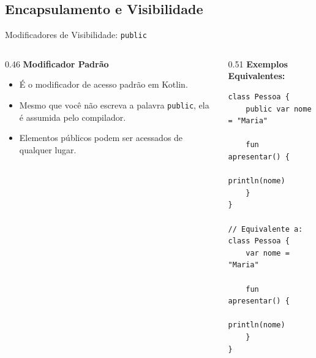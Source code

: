 \documentclass[aspectratio=169]{beamer}
\begin{document}
\subsection{Encapsulamento e Visibilidade}

\begin{frame}[fragile]{Modificadores de Visibilidade: \texttt{public}}
  \begin{columns}[T]
    \begin{column}{0.46\textwidth}
      \textbf{Modificador Padrão}
      \vspace{0.3em}
      \begin{itemize}\small
        \item É o modificador de acesso padrão em Kotlin.
        \item Mesmo que você não escreva a palavra \texttt{public}, ela é assumida pelo compilador.
        \item Elementos públicos podem ser acessados de qualquer lugar.
      \end{itemize}
    \end{column}
    \begin{column}{0.51\textwidth}
      \textbf{Exemplos Equivalentes:}
\begin{lstlisting}[style=KotlinStyle]
class Pessoa {
    public var nome = "Maria"

    fun apresentar() {
        println(nome)
    }
}

// Equivalente a:
class Pessoa {
    var nome = "Maria"

    fun apresentar() {
        println(nome)
    }
}
\end{lstlisting}
    \end{column}
  \end{columns}
\end{frame}
\end{document}
